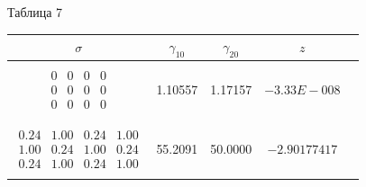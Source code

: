 \medskip







\hspace{122mm} Таблица 7


\smallskip





\begin{center}


\begin{tabular}{|c|c|c|c|c|} \hline


$\sigma$ & $\gamma_{10}$ & $\gamma_{20}$ & $z$ \\


\hline




$\begin{smallmatrix}


\ & \ & \ & \ \\


0 &0 &0 &0 \\ 0 &0 &0 &0 \\ 0 &0 &0 &0 \\


\ & \ & \ & \ 


\end{smallmatrix}$ & 1.10557 & 1.17157 & $-3.33 E-008$ \\


\hline




$\begin{smallmatrix}


\ & \ & \ & \  \\


0.24 &1.00 &0.24 &1.00 \\ 1.00 &0.24 &1.00 &0.24 \\


0.24 &1.00 &0.24 &1.00 \\


\ & \ & \ & \ 


\end{smallmatrix}$ & 55.2091 & 50.0000 & $-2.90177417$ \\


\hline





\end{tabular}
\end{center}
